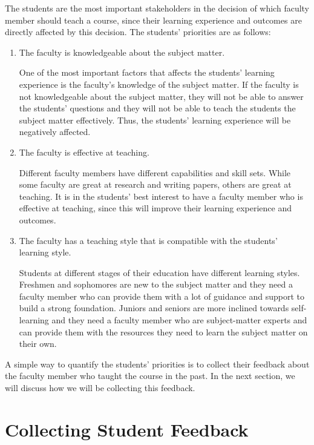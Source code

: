 The students are the most important stakeholders in the decision of which faculty member should teach a course, since their learning experience and outcomes are directly affected by this decision. The students' priorities are as follows:

\begin{enumerate}
  \item {The faculty is knowledgeable about the subject matter.}

        One of the most important factors that affects the students' learning experience is the faculty's knowledge of the subject matter. If the faculty is not knowledgeable about the subject matter, they will not be able to answer the students' questions and they will not be able to teach the students the subject matter effectively. Thus, the students' learning experience will be negatively affected.

  \item {The faculty is effective at teaching.}

        Different faculty members have different capabilities and skill sets. While some faculty are great at research and writing papers, others are great at teaching. It is in the students' best interest to have a faculty member who is effective at teaching, since this will improve their learning experience and outcomes.

  \item {The faculty has a teaching style that is compatible with the students' learning style.}

        Students at different stages of their education have different learning styles. Freshmen and sophomores are new to the subject matter and they need a faculty member who can provide them with a lot of guidance and support to build a strong foundation. Juniors and seniors are more inclined towards self-learning and they need a faculty member who are subject-matter experts and can provide them with the resources they need to learn the subject matter on their own.

\end{enumerate}

A simple way to quantify the students' priorities is to collect their feedback about the faculty member who taught the course in the past. In the next section, we will discuss how we will be collecting this feedback.

\section{Collecting Student Feedback}

